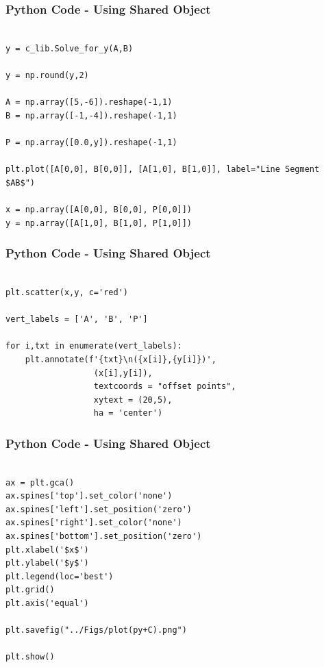 \documentclass{beamer}
\begin{document}
\begin{frame}[fragile]
    \frametitle{Python Code - Using Shared Object}
    \begin{lstlisting}

y = c_lib.Solve_for_y(A,B)

y = np.round(y,2)

A = np.array([5,-6]).reshape(-1,1) 
B = np.array([-1,-4]).reshape(-1,1)

P = np.array([0.0,y]).reshape(-1,1)

plt.plot([A[0,0], B[0,0]], [A[1,0], B[1,0]], label="Line Segment $AB$")

x = np.array([A[0,0], B[0,0], P[0,0]])
y = np.array([A[1,0], B[1,0], P[1,0]])

\end{lstlisting}
\end{frame}

\begin{frame}[fragile]
    \frametitle{Python Code - Using Shared Object}
    \begin{lstlisting}
    
plt.scatter(x,y, c='red')

vert_labels = ['A', 'B', 'P']

for i,txt in enumerate(vert_labels):
    plt.annotate(f'{txt}\n({x[i]},{y[i]})',
                  (x[i],y[i]),
                  textcoords = "offset points",
                  xytext = (20,5),
                  ha = 'center')

\end{lstlisting}
\end{frame}



\begin{frame}[fragile]
    \frametitle{Python Code - Using Shared Object}
    \begin{lstlisting}
    
ax = plt.gca()
ax.spines['top'].set_color('none')
ax.spines['left'].set_position('zero')
ax.spines['right'].set_color('none')
ax.spines['bottom'].set_position('zero')
plt.xlabel('$x$')
plt.ylabel('$y$')
plt.legend(loc='best')
plt.grid() 
plt.axis('equal')

plt.savefig("../Figs/plot(py+C).png")

plt.show()

\end{lstlisting}
\end{frame}
\end{document}

